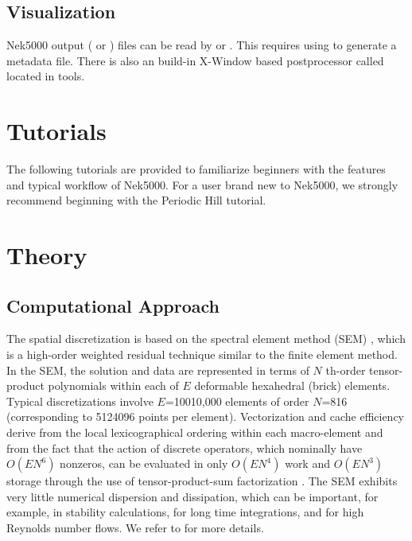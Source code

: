 \documentclass[letterpaper,10pt,english]{sphinxmanual}
\begin{document}
\subsection{Visualization}
\label{\detokenize{quickstart:qstart-vis}}\label{\detokenize{quickstart:visualization}}
Nek5000 output ( or ) files can be read by  or
. This requires using  to generate a metadata file.
There is also an build-in X-Window based postprocessor called  located in tools.


\section{Tutorials}
\label{\detokenize{tutorials:id1}}\label{\detokenize{tutorials:tutorials}}\label{\detokenize{tutorials::doc}}
The following tutorials are provided to familiarize beginners with the features and typical workflow of Nek5000.
For a user brand new to Nek5000, we strongly recommend beginning with the Periodic Hill tutorial.


\section{Theory}
\label{\detokenize{theory::doc}}\label{\detokenize{theory:theory}}

\subsection{Computational Approach}
\label{\detokenize{theory:computational-approach}}\label{\detokenize{theory:intro-comput-approach}}
The spatial discretization is based on the spectral element method (SEM) \label{\detokenize{theory:id1}}{\hyperref[\detokenize{bibliography:patera1984}]{\sphinxcrossref{{[}Patera1984{]}}}}, which is a
high-order weighted residual technique similar to the finite element method.   In the SEM, the
solution and data are represented in terms of \(N\) th-order tensor-product polynomials within each
of \(E\) deformable hexahedral (brick) elements. Typical discretizations involve
\(E\)=100\textendash{}10,000 elements of order \(N\)=8\textendash{}16 (corresponding to 512\textendash{}4096 points per
element).  Vectorization and cache efficiency derive from the local lexicographical ordering within
each macro-element and from the fact that the action of discrete operators, which nominally have
\(O(EN^6)\) nonzeros, can be evaluated in only \(O(EN^4)\) work and \(O(EN^3)\) storage
through the use of tensor-product-sum factorization \label{\detokenize{theory:id2}}{\hyperref[\detokenize{bibliography:orszag1980}]{\sphinxcrossref{{[}Orszag1980{]}}}}.   The SEM exhibits very little
numerical dispersion and dissipation, which can be important, for example, in stability
calculations, for long time integrations, and for high Reynolds number flows. We refer to
\label{\detokenize{theory:id3}}{\hyperref[\detokenize{bibliography:denville2002}]{\sphinxcrossref{{[}Denville2002{]}}}} for more details.
\end{document}
